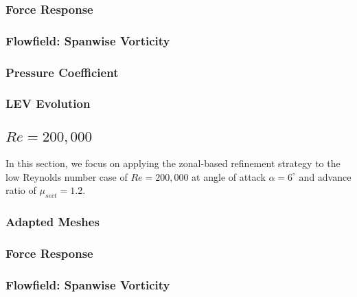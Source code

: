 \subsubsection{Force Response}

\label{sec:zonal_force_response}

\subsubsection{Flowfield: Spanwise Vorticity}

\label{sec:zonal_vorticity}

\subsubsection{Pressure Coefficient}

\label{sec:zonal_cp}

\subsubsection{LEV Evolution}

\label{sec:zonal_LEV}


\subsection{ $Re=200,000$}

In this section, we focus on applying the zonal-based refinement strategy to the low Reynolds number case of $Re=200,000$ at angle of attack $\alpha=6^\circ$ and advance ratio of $\mu_{sect}=1.2$.

\subsubsection{Adapted Meshes}

\label{sec:zonal_mesh_and_error_Re200k}


\subsubsection{Force Response}

\label{sec:zonal_force_response_Re200k}

\subsubsection{Flowfield: Spanwise Vorticity}

\label{sec:zonal_vorticity_Re200k}

